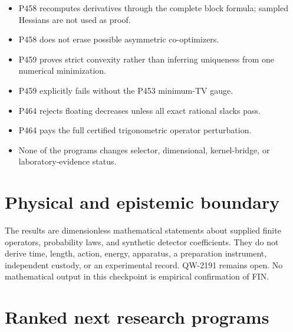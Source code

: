 \documentclass[11pt,a4paper,openany]{report}
\begin{document}
\begin{itemize}
\item 
P458 recomputes derivatives through the complete block formula; sampled Hessians are not used as proof.

\item 
P458 does not erase possible asymmetric co-optimizers.

\item 
P459 proves strict convexity rather than inferring uniqueness from one numerical minimization.

\item 
P459 explicitly fails without the P453 minimum-TV gauge.

\item 
P464 rejects floating decreases unless all exact rational slacks pass.

\item 
P464 pays the full certified trigonometric operator perturbation.

\item 
None of the programs changes selector, dimensional, kernel-bridge, or laboratory-evidence status.

\end{itemize}

\chapter{Physical and epistemic boundary}

The results are dimensionless mathematical statements about supplied finite operators, probability laws, and synthetic detector coefficients. They do not derive time, length, action, energy, apparatus, a preparation instrument, independent custody, or an experimental record. QW-2191 remains open. No mathematical output in this checkpoint is empirical confirmation of FIN.

\chapter{Ranked next research programs}
\end{document}
